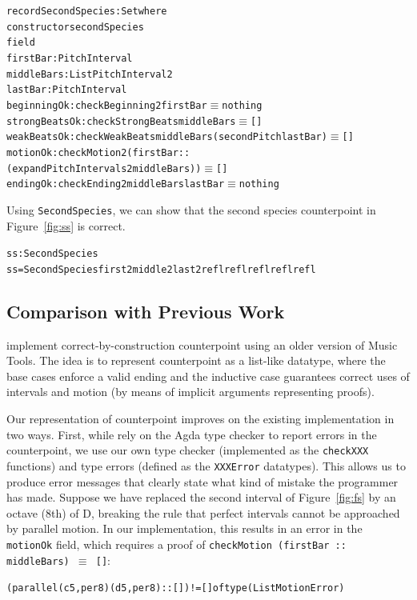 \begin{alltt}
record SecondSpecies : Set where
  constructor secondSpecies
  field
    firstBar      : PitchInterval 
    middleBars    : List PitchInterval2
    lastBar       : PitchInterval 
    beginningOk   : checkBeginning2 firstBar \(\equiv\) nothing
    strongBeatsOk : checkStrongBeats middleBars \(\equiv\) []
    weakBeatsOk   : checkWeakBeats middleBars (secondPitch lastBar) \(\equiv\) []
    motionOk      : checkMotion2 (firstBar ::
                                  (expandPitchIntervals2 middleBars)) \(\equiv\) []
    endingOk      : checkEnding2 middleBars lastBar \(\equiv\) nothing
\end{alltt}

Using \texttt{SecondSpecies}, we can show that the second species
counterpoint in Figure~\ref{fig:ss} is correct.

\begin{alltt}
ss : SecondSpecies
ss = SecondSpecies first2 middle2 last2 refl refl refl refl refl
\end{alltt}

\subsection{Comparison with Previous Work}
\label{sec:cp:comp}

\citet{cong-cp} implement correct-by-construction counterpoint
using an older version of Music Tools.
The idea is to represent counterpoint as a list-like datatype,
where the base cases enforce a valid ending and the inductive case
guarantees correct uses of intervals and motion (by means of
implicit arguments representing proofs).

Our representation of counterpoint improves on the existing
implementation in two ways.
First, while \citet{cong-cp} rely on the Agda type checker to report
errors in the counterpoint, we use our own type checker (implemented
as the \texttt{checkXXX} functions) and type errors (defined as the
\texttt{XXXError} datatypes).
This allows us to produce error messages that clearly state what
kind of mistake the programmer has made.
Suppose we have replaced the second interval of Figure~\ref{fig:fs} by
an octave (8th) of D, breaking the rule that perfect intervals cannot
be approached by parallel motion.
In our implementation, this results in an error in the
\texttt{motionOk} field, which requires a proof of
\texttt{checkMotion (firstBar :: middleBars) \(\equiv\) []}:

\begin{alltt}
(parallel (c 5 , per8) (d 5 , per8) :: []) != [] of type (List MotionError)
\end{alltt}

